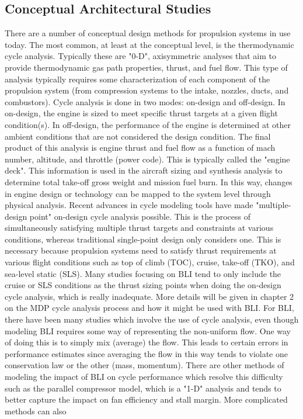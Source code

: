 \subsection{Conceptual Architectural Studies}
There are a number of conceptual design methods for propulsion systems in use today. The most common, at least at the conceptual level, is the thermodynamic cycle analysis. Typically these are "0-D", axisymmetric analyses that aim to provide thermodynamic gas path properties, thrust, and fuel flow. This type of analysis typically requires some characterization of each component of the propulsion system (from compression systems to the intake, nozzles, ducts, and combustors).  Cycle analysis is done in two modes: on-design and off-design. In on-design, the engine is sized to meet specific thrust targets at a given flight condition(s). In off-design, the performance of the engine is determined at other ambient conditions that are not considered the design condition. The final product of this analysis is engine thrust and fuel flow as a function of mach number, altitude, and throttle (power code). This is typically called the "engine deck". This information is used in the aircraft sizing and synthesis analysis to determine total take-off gross weight and mission fuel burn. In this way, changes in engine design or technology can be mapped to the system level through physical analysis.  Recent advances in cycle modeling tools have made "multiple-design point" on-design cycle analysis possible. This is the process of simultaneously satisfying multiple thrust targets and constraints at various conditions, whereas traditional single-point design only considers one. This is necessary because propulsion systems need to satisfy thrust requirements at various flight conditions such as top of climb (TOC), cruise, take-off (TKO), and sea-level static (SLS). Many studies focusing on BLI tend to only include the cruise or SLS conditions as the thrust sizing points when doing the on-design cycle analysis, which is really inadequate. More details will be given in chapter 2 on the MDP cycle analysis process and how it might be used with BLI.  For BLI, there have been many studies which involve the use of cycle analysis, even though modeling BLI requires some way of representing the non-uniform flow.  One way of doing this is to simply mix (average) the flow. This leads to certain errors in performance estimates since averaging the flow in this way tends to violate one conservation law or the other (mass, momentum). There are other methods of modeling the impact of BLI on cycle performance which resolve this difficulty such as the parallel compressor model, which is a "1-D" analysis and tends to better capture the impact on fan efficiency and stall margin. More complicated methods can also

